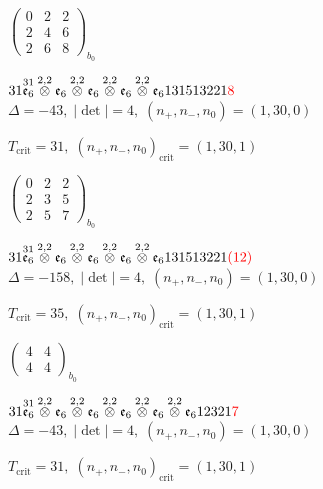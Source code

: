 \documentclass[10pt]{article}
\begin{document}
\hspace{2em}$\left(\begin{smallmatrix}0 & 2 & 2 \\ 2 & 4 & 6 \\ 2 & 6 & 8\end{smallmatrix}\right)_{\!b_0}$

$31\overset{31}{\mathfrak{e}_6}\overset{2,2}{\otimes}\mathfrak{e}_6\overset{2,2}{\otimes}\mathfrak{e}_6\overset{2,2}{\otimes}\mathfrak{e}_6\overset{2,2}{\otimes}\mathfrak{e}_6131513221\textcolor{red}{8}$ \quad $\Delta=-43,\; |\det|=4,\; (n_+,n_-,n_0)=(1,30,0)$

\hspace{1em}$T_{\text{crit}}=31,\; (n_+,n_-,n_0)_{\text{crit}}=(1,30,1)$

\hspace{2em}$\left(\begin{smallmatrix}0 & 2 & 2 \\ 2 & 3 & 5 \\ 2 & 5 & 7\end{smallmatrix}\right)_{\!b_0}$

$31\overset{31}{\mathfrak{e}_6}\overset{2,2}{\otimes}\mathfrak{e}_6\overset{2,2}{\otimes}\mathfrak{e}_6\overset{2,2}{\otimes}\mathfrak{e}_6\overset{2,2}{\otimes}\mathfrak{e}_6131513221\textcolor{red}{(12)}$ \quad $\Delta=-158,\; |\det|=4,\; (n_+,n_-,n_0)=(1,30,0)$

\hspace{1em}$T_{\text{crit}}=35,\; (n_+,n_-,n_0)_{\text{crit}}=(1,30,1)$

\hspace{2em}$\left(\begin{smallmatrix}4 & 4 \\ 4 & 4\end{smallmatrix}\right)_{\!b_0}$

\smallskip

$31\overset{31}{\mathfrak{e}_6}\overset{2,2}{\otimes}\mathfrak{e}_6\overset{2,2}{\otimes}\mathfrak{e}_6\overset{2,2}{\otimes}\mathfrak{e}_6\overset{2,2}{\otimes}\mathfrak{e}_6\overset{2,2}{\otimes}\mathfrak{e}_612321\textcolor{red}{7}$ \quad $\Delta=-43,\; |\det|=4,\; (n_+,n_-,n_0)=(1,30,0)$

\hspace{1em}$T_{\text{crit}}=31,\; (n_+,n_-,n_0)_{\text{crit}}=(1,30,1)$
\end{document}
